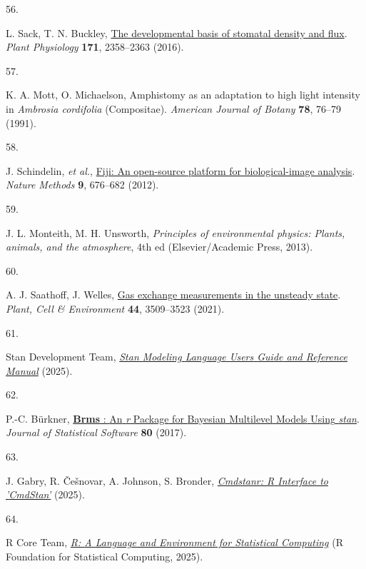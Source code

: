 \documentclass[
  letterpaper,
  DIV=11,
  numbers=noendperiod]{scrartcl}
\newlength{\cslhangindent}
\newlength{\csllabelwidth}
\newenvironment{CSLReferences}[2] %
 {\begin{list}{}{%
  \setlength{\itemindent}{0pt}
  \setlength{\leftmargin}{0pt}
  \setlength{\parsep}{0pt}
  \ifodd #1
   \setlength{\leftmargin}{\cslhangindent}
   \setlength{\itemindent}{-1\cslhangindent}
  \fi
  \setlength{\itemsep}{#2\baselineskip}}}
 {\end{list}}
\newcommand{\CSLLeftMargin}[1]{\parbox[t]{\csllabelwidth}{\strut#1\strut}}
\newcommand{\CSLRightInline}[1]{\parbox[t]{\linewidth - \csllabelwidth}{\strut#1\strut}}
\begin{document}
\begin{CSLReferences}{0}{1}
\CSLLeftMargin{56. }%
\CSLRightInline{L. Sack, T. N. Buckley,
\href{https://doi.org/10.1104/pp.16.00476}{The developmental basis of
stomatal density and flux}. \emph{Plant Physiology} \textbf{171},
2358--2363 (2016).}

\CSLLeftMargin{57. }%
\CSLRightInline{K. A. Mott, O. Michaelson, Amphistomy as an adaptation
to high light intensity in \emph{{Ambrosia} cordifolia} ({Compositae}).
\emph{American Journal of Botany} \textbf{78}, 76--79 (1991).}

\CSLLeftMargin{58. }%
\CSLRightInline{J. Schindelin, \emph{et al.},
\href{https://doi.org/10.1038/nmeth.2019}{Fiji: An open-source platform
for biological-image analysis}. \emph{Nature Methods} \textbf{9},
676--682 (2012).}

\CSLLeftMargin{59. }%
\CSLRightInline{J. L. Monteith, M. H. Unsworth, \emph{Principles of
environmental physics: Plants, animals, and the atmosphere}, 4th ed
(Elsevier/Academic Press, 2013).}

\CSLLeftMargin{60. }%
\CSLRightInline{A. J. Saathoff, J. Welles,
\href{https://doi.org/10.1111/pce.14178}{Gas exchange measurements in
the unsteady state}. \emph{Plant, Cell \& Environment} \textbf{44},
3509--3523 (2021).}

\CSLLeftMargin{61. }%
\CSLRightInline{Stan Development Team,
\emph{\href{https://mc-stan.org}{Stan {Modeling} {Language} {Users}
{Guide} and {Reference} {Manual}}} (2025).}

\CSLLeftMargin{62. }%
\CSLRightInline{P.-C. Bürkner,
\href{https://doi.org/10.18637/jss.v080.i01}{\textbf{Brms} : {An}
\emph{r} {Package} for {Bayesian} {Multilevel} {Models} {Using}
\emph{stan}}. \emph{Journal of Statistical Software} \textbf{80}
(2017).}

\CSLLeftMargin{63. }%
\CSLRightInline{J. Gabry, R. Češnovar, A. Johnson, S. Bronder,
\emph{\href{https://mc-stan.org/cmdstanr,\%20https://discourse.mc-stan.org}{Cmdstanr:
{R} {Interface} to '{CmdStan}'}} (2025).}

\CSLLeftMargin{64. }%
\CSLRightInline{R Core Team, \emph{\href{http://www.R-project.org/}{R:
{A} {Language} and {Environment} for {Statistical} {Computing}}} (R
Foundation for Statistical Computing, 2025).}


\end{CSLReferences}
\end{document}
